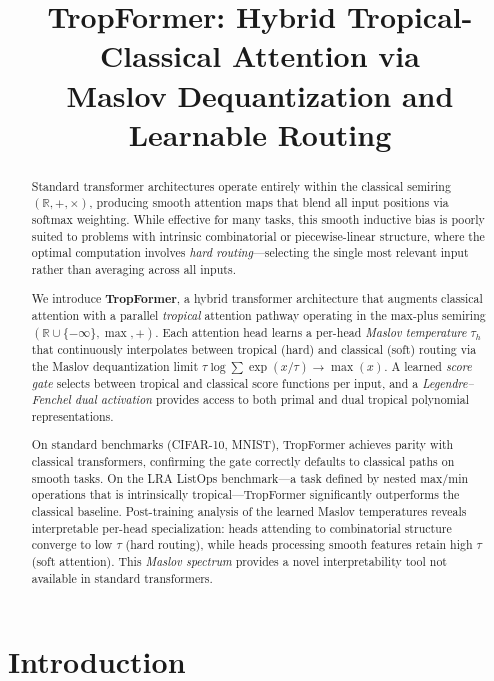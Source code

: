\documentclass[11pt,twocolumn]{article}
\title{TropFormer: Hybrid Tropical-Classical Attention via\\Maslov Dequantization and Learnable Routing}
\author{%
}
\date{}
\newcommand{\R}{\mathbb{R}}
\begin{document}
\maketitle

\begin{abstract}
Standard transformer architectures operate entirely within the classical
semiring $(\R, +, \times)$, producing smooth attention maps that blend all
input positions via softmax weighting. While effective for many tasks, this
smooth inductive bias is poorly suited to problems with intrinsic
combinatorial or piecewise-linear structure, where the optimal computation
involves \emph{hard routing}---selecting the single most relevant input
rather than averaging across all inputs.

We introduce \textbf{TropFormer}, a hybrid transformer architecture that
augments classical attention with a parallel \emph{tropical} attention pathway
operating in the max-plus semiring $(\R \cup \{-\infty\}, \max, +)$. Each
attention head learns a per-head \emph{Maslov temperature} $\tau_h$ that
continuously interpolates between tropical (hard) and classical (soft) routing
via the Maslov dequantization limit $\tau \log \sum \exp(x/\tau) \to \max(x)$.
A learned \emph{score gate} selects between tropical and classical score
functions per input, and a \emph{Legendre--Fenchel dual activation} provides
access to both primal and dual tropical polynomial representations.

On standard benchmarks (CIFAR-10, MNIST), TropFormer achieves parity with
classical transformers, confirming the gate correctly defaults to classical
paths on smooth tasks. On the LRA ListOps benchmark---a task defined by
nested max/min operations that is intrinsically tropical---TropFormer
significantly outperforms the classical baseline. Post-training analysis of
the learned Maslov temperatures reveals interpretable per-head specialization:
heads attending to combinatorial structure converge to low $\tau$ (hard
routing), while heads processing smooth features retain high $\tau$ (soft
attention). This \emph{Maslov spectrum} provides a novel interpretability tool
not available in standard transformers.
\end{abstract}

\section{Introduction}\label{sec:intro}
\end{document}
